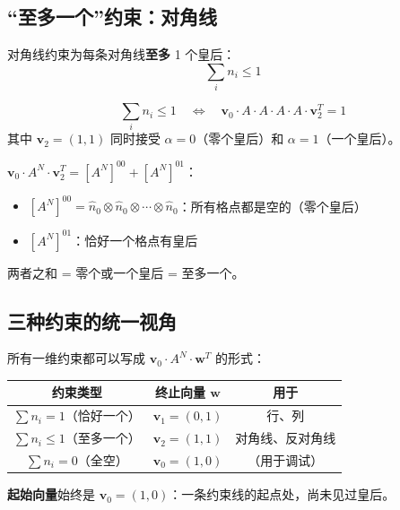 \documentclass[12pt,a4paper]{article}
\begin{document}
\subsection{``至多一个''约束：对角线}

对角线约束为每条对角线\textbf{至多} 1 个皇后：
\[
\sum_i n_i \leq 1
\]

\begin{keybox}[对角线约束]
\[
\sum_i n_i \leq 1 \quad \Longleftrightarrow \quad \mathbf{v}_0 \cdot A \cdot A \cdot A \cdot A \cdot \mathbf{v}_2^T = 1
\]
其中 $\mathbf{v}_2 = (1, 1)$ 同时接受 $\alpha = 0$（零个皇后）和 $\alpha = 1$（一个皇后）。
\end{keybox}

\begin{exbox}[验证``至多一个'']
$\mathbf{v}_0 \cdot A^N \cdot \mathbf{v}_2^T = [A^N]^{00} + [A^N]^{01}$：
\begin{itemize}
  \item $[A^N]^{00} = \hat{n}_0 \otimes \hat{n}_0 \otimes \cdots \otimes \hat{n}_0$：所有格点都是空的（零个皇后）
  \item $[A^N]^{01}$：恰好一个格点有皇后
\end{itemize}
两者之和 = 零个或一个皇后 = 至多一个。
\end{exbox}

\subsection{三种约束的统一视角}

\begin{sumbox}[统一框架]
所有一维约束都可以写成 $\mathbf{v}_0 \cdot A^N \cdot \mathbf{w}^T$ 的形式：

\begin{center}
\renewcommand{\arraystretch}{1.3}
\begin{tabular}{ccc}
\toprule
约束类型 & 终止向量 $\mathbf{w}$ & 用于 \\
\midrule
$\sum n_i = 1$（恰好一个） & $\mathbf{v}_1 = (0, 1)$ & 行、列 \\
$\sum n_i \leq 1$（至多一个） & $\mathbf{v}_2 = (1, 1)$ & 对角线、反对角线 \\
$\sum n_i = 0$（全空） & $\mathbf{v}_0 = (1, 0)$ & （用于调试） \\
\bottomrule
\end{tabular}
\end{center}

\textbf{起始向量}始终是 $\mathbf{v}_0 = (1, 0)$：一条约束线的起点处，尚未见过皇后。
\end{sumbox}
\end{document}
